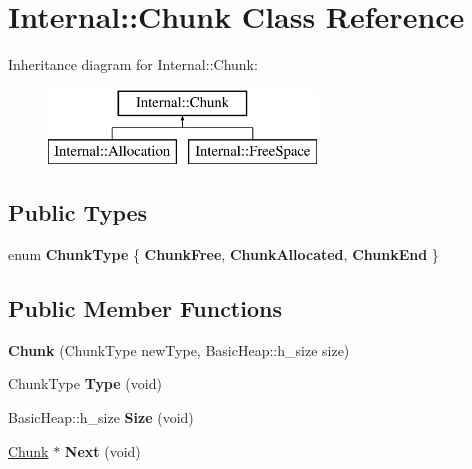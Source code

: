 \hypertarget{class_internal_1_1_chunk}{}\section{Internal\+:\+:Chunk Class Reference}
\label{class_internal_1_1_chunk}
Inheritance diagram for Internal\+:\+:Chunk\+:\begin{figure}[H]
\begin{center}
\leavevmode
\includegraphics[height=2.000000cm]{class_internal_1_1_chunk}
\end{center}
\end{figure}
\subsection*{Public Types}
\begin{DoxyCompactItemize}
\item 
\mbox{\label{class_internal_1_1_chunk_ab95e8afeb4d71a68331154ac5e318f7b}} 
enum {\bfseries Chunk\+Type} \{ {\bfseries Chunk\+Free}, 
{\bfseries Chunk\+Allocated}, 
{\bfseries Chunk\+End}
 \}
\end{DoxyCompactItemize}
\subsection*{Public Member Functions}
\begin{DoxyCompactItemize}
\item 
\mbox{\label{class_internal_1_1_chunk_a72381e96bf7266774d4fe4999b2be009}} 
{\bfseries Chunk} (Chunk\+Type new\+Type, Basic\+Heap\+::h\+\_\+size size)
\item 
\mbox{\label{class_internal_1_1_chunk_a8b80771d7218ea6827d4872d3f9abab9}} 
Chunk\+Type {\bfseries Type} (void)
\item 
\mbox{\label{class_internal_1_1_chunk_ac053bf3bc4368a64903683a3f7ad2af9}} 
Basic\+Heap\+::h\+\_\+size {\bfseries Size} (void)
\item 
\mbox{\label{class_internal_1_1_chunk_a8cc473a68b10da970ab3cab3ebfe9b97}} 
\hyperlink{class_internal_1_1_chunk}{Chunk} $\ast$ {\bfseries Next} (void)
\end{DoxyCompactItemize}

